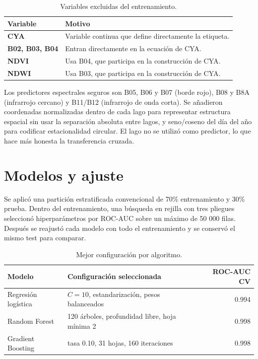 \documentclass[11pt,letterpaper]{article}
\begin{document}
\begin{table}[H]
\centering
\caption{Variables excluidas del entrenamiento.}
\label{tab:leakage}
\begin{tabularx}{\textwidth}{>{\bfseries}lX}
\toprule
Variable & Motivo\\
\midrule
CYA & Variable continua que define directamente la etiqueta.\\
B02, B03, B04 & Entran directamente en la ecuación de CYA.\\
NDVI & Usa B04, que participa en la construcción de CYA.\\
NDWI & Usa B03, que participa en la construcción de CYA.\\
\bottomrule
\end{tabularx}
\end{table}

Los predictores espectrales seguros son B05, B06 y B07 (borde rojo), B08 y B8A (infrarrojo cercano) y B11/B12 (infrarrojo de onda corta). Se añadieron coordenadas normalizadas dentro de cada lago para representar estructura espacial sin usar la separación absoluta entre lagos, y seno/coseno del día del año para codificar estacionalidad circular. El lago no se utilizó como predictor, lo que hace más honesta la transferencia cruzada.

\section{Modelos y ajuste}

Se aplicó una partición estratificada convencional de 70\% entrenamiento y 30\% prueba. Dentro del entrenamiento, una búsqueda en rejilla con tres pliegues seleccionó hiperparámetros por ROC-AUC sobre un máximo de 50 000 filas. Después se reajustó cada modelo con todo el entrenamiento y se conservó el mismo test para comparar.

\begin{table}[H]
\centering
\caption{Mejor configuración por algoritmo.}
\begin{tabularx}{\textwidth}{lXr}
\toprule
Modelo & Configuración seleccionada & ROC-AUC CV\\
\midrule
Regresión logística & $C=10$, estandarización, pesos balanceados & 0.994\\
Random Forest & 120 árboles, profundidad libre, hoja mínima 2 & 0.998\\
Gradient Boosting & tasa 0.10, 31 hojas, 160 iteraciones & 0.998\\
\bottomrule
\end{tabularx}
\end{table}
\end{document}
